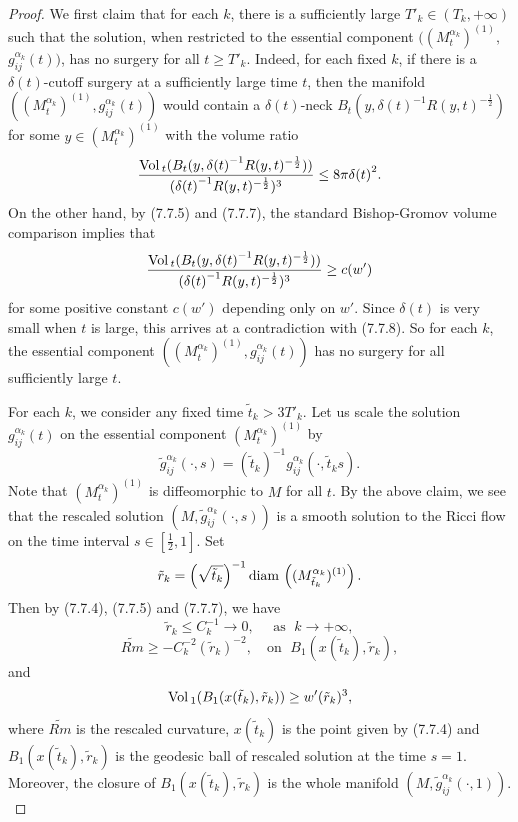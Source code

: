 \begin{proof}
We first claim that for each $k$, there is a sufficiently large
$T'_k \in (T_k,+\infty)$ such that the solution, when restricted
to the essential component $((M^{\alpha_k}_t)^{(1)},$
$g^{\alpha_k}_{ij}(t))$, has no surgery for all $t\geq T'_k$.
Indeed, for each fixed $k$, if there is a $\delta(t)$-cutoff
surgery at a sufficiently large time $t$, then the manifold
$((M^{\alpha_k}_t)^{(1)},g^{\alpha_k}_{ij}(t))$ would contain a
$\delta(t)$-neck $B_t(y,{\delta(t)}^{-1}R(y,t)^{-\frac{1}{2}})$
for some $y \in (M^{\alpha_k}_t)^{(1)}$ with the volume ratio \begin{equation}
\frac{\Vol_t(B_t(y,{\delta(t)}^{-1}
R(y,t)^{-\frac{1}{2}}))}{({\delta(t)}^{-1}R(y,t)^{-\frac{1}{2}})^3}
\leq 8\pi{\delta(t)}^2. %
\end{equation} On the other hand, by (7.7.5) and (7.7.7), the standard
Bishop-Gromov volume comparison implies that
$$
\frac{{\rm Vol}\,_t(B_t(y,{\delta(t)}^{-1}
R(y,t)^{-\frac{1}{2}}))}{({\delta(t)}^{-1}R(y,t)^{-\frac{1}{2}})^3}
\geq c(w')
$$
for some positive constant $c(w')$ depending only on $w'$. Since
$\delta(t)$ is very small when $t$ is large, this arrives at a
contradiction with (7.7.8). So for each $k$, the essential
component $((M^{\alpha_k}_t)^{(1)},g^{\alpha_k}_{ij}(t))$ has no
surgery for all sufficiently large $t$.

For each $k$, we consider any fixed time $\tilde{t}_k > 3 T'_k$.
Let us scale the solution $g^{\alpha_k}_{ij}(t)$ on the essential
component $(M^{\alpha_k}_t)^{(1)}$ by
$$
\tilde{g}^{\alpha_k}_{ij}(\cdot,s) =
(\tilde{t}_{k})^{-1}g^{\alpha_k}_{ij}(\cdot,\tilde{t}_{k}s).
$$
Note that $(M^{\alpha_k}_t)^{(1)}$ is diffeomorphic to $M$ for all
$t$. By the above claim, we see that the rescaled solution
$(M,\tilde{g}^{\alpha_k}_{ij}(\cdot,s))$ is a smooth solution to
the Ricci flow on the time interval $s \in [\frac{1}{2},1]$. Set
$$
\tilde{r}_k = \left(\sqrt{\tilde{t}_k}\right)^{-1} {\rm
diam}\,\left((M^{\alpha_k}_{\tilde{t}_k})^{(1)}\right).
$$
Then by (7.7.4), (7.7.5) and (7.7.7), we have
$$
\tilde{r}_k \leq C^{-1}_k \rightarrow 0, \quad \mbox{ as }\; k
\rightarrow +\infty,
$$
$$
\widetilde{Rm} \geq -C^{-2}_k(\tilde{r}_k)^{-2}, \quad \mbox{on }
\; B_1(x(\tilde{t}_k),\tilde{r}_k),
$$
and
$$
{\rm Vol}\,_1(B_1(x(\tilde{t}_k),\tilde{r}_k)) \geq w'(\tilde{r}_k)^3,
$$
where $\widetilde{Rm}$ is the rescaled curvature, $x(\tilde{t}_k)$
is the point given by (7.7.4) and
$B_1(x(\tilde{t}_k),\tilde{r}_k)$ is the geodesic ball of rescaled
solution at the time $s=1$. Moreover, the closure of
$B_1(x(\tilde{t}_k),\tilde{r}_k)$ is the whole manifold
$(M,\tilde{g}^{\alpha_k}_{ij}(\cdot,1)).$


\end{proof}
